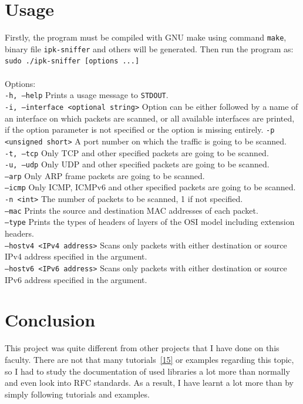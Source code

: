 \documentclass[12pt]{article}
\begin{document}
\section{Usage}
Firstly, the program must be compiled with GNU make using command \texttt{make}, binary file \texttt{ipk-sniffer} and others will be generated. Then run the program as:\\
\texttt{sudo ./ipk-sniffer [options ...]}
\\
\\
Options:\\
\texttt{-h, --help}\tabto{13.5em} Prints a usage message to \texttt{STDOUT}.\\
\texttt{-i, --interface <optional string>}\hspace{1.7em} Option can be either followed by a name of an interface on which packets are scanned, or all available interfaces are printed, if the option parameter is not specified or the option is missing entirely.\newline
\texttt{-p <unsigned short>}\tabto{13.5em} A port number on which the traffic is going to be scanned.\\
\texttt{-t, --tcp}\tabto{13.5em} Only TCP and other specified packets are going to be scanned.\\
\texttt{-u, --udp}\tabto{13.5em} Only UDP and other specified packets are going to be scanned.\\
\texttt{--arp}\tabto{13.5em} Only ARP frame packets are going to be scanned.\\
\texttt{--icmp}\tabto{13.5em} Only ICMP, ICMPv6 and other specified packets are going to be scanned.\\
\texttt{-n <int>}\tabto{13.5em} The number of packets to be scanned, 1 if not specified.\\
\texttt{--mac}\tabto{13.5em} Prints the source and destination MAC addresses of each packet.\\
\texttt{--type}\tabto{13.5em} Prints the types of headers of layers of the OSI model including extension headers.\\
\texttt{--hostv4 <IPv4 address>}\tabto{13.5em} Scans only packets with either destination or source IPv4 address specified in the argument.\\
\texttt{--hostv6 <IPv6 address>}\tabto{13.5em} Scans only packets with either destination or source IPv6 address specified in the argument.

\section{Conclusion}
This project was quite different from other projects that I have done on this faculty. There are not that many tutorials~\hyperref[cit15]{[15]} or examples regarding this topic, so I had to study the documentation of used libraries a lot more than normally and even look into RFC standards. As a result, I have learnt a lot more than by simply following tutorials and examples.
\newpage
\end{document}
